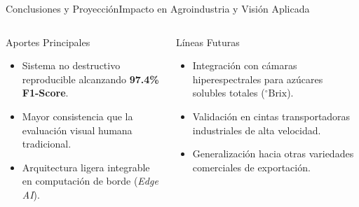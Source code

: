 \documentclass[aspectratio=169, 10pt]{beamer}
\begin{document}
\begin{frame}{Conclusiones y Proyección}{Impacto en Agroindustria y Visión Aplicada}
    \begin{columns}[T]
        \begin{block}{Aportes Principales}
            \begin{itemize}
                \item Sistema no destructivo reproducible alcanzando \textbf{97.4\% F1-Score}.
                \item Mayor consistencia que la evaluación visual humana tradicional.
                \item Arquitectura ligera integrable en computación de borde (\textit{Edge AI}).
            \end{itemize}
        \end{block}

        \begin{successblock}{Líneas Futuras}
            \begin{itemize}
                \item Integración con cámaras hiperespectrales para azúcares solubles totales ($^\circ\text{Brix}$).
                \item Validación en cintas transportadoras industriales de alta velocidad.
                \item Generalización hacia otras variedades comerciales de exportación.
            \end{itemize}
        \end{successblock}
    \end{columns}
\end{frame}

\end{document}
